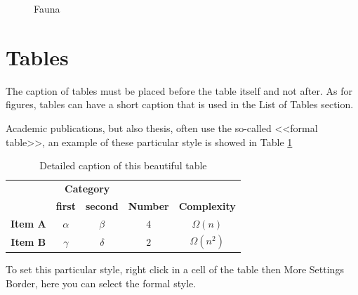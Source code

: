\begin{figure}[h]
\hfill{}\hfill{}\hfill{}

\caption{\label{fig:subfig-fauna}Fauna}

\end{figure}

\section{Tables}

The caption of tables must be placed before the table itself and not
after. As for figures, tables can have a short caption that is used
in the \textsf{List of Tables} section.

Academic publications, but also thesis, often use the so-called <<formal
table>>, an example of these particular style is showed in Table
\ref{tab:formal-table}

\begin{table}[h]
\centering{}\caption[Short caption of the table]{\label{tab:formal-table}Detailed caption of this beautiful table}
{\small{}}%
\begin{tabular}{ccccc}
\toprule 
 & \multicolumn{2}{c}{\textbf{Category}} &  & \tabularnewline
\cmidrule{2-3} 
 & \textbf{first} & \textbf{second} & \textbf{Number} & \textbf{Complexity}\tabularnewline
\midrule 
\textbf{Item A} & $\alpha$ & $\beta$ & $4$ & $\Omega\left(n\right)$\tabularnewline
\textbf{Item B} & $\gamma$ & $\delta$ & $2$ & $\Omega\left(n^{2}\right)$\tabularnewline
\bottomrule
\end{tabular}
\end{table}
To set this particular style, right click in a cell of the table then
\textsf{More} \textsf{\lyxarrow} \textsf{Settings} \textsf{\lyxarrow}
\textsf{Border}, here you can select the formal style.

